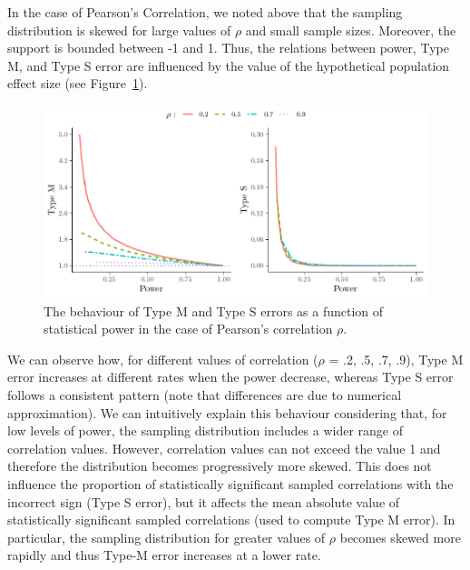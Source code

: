 \documentclass{article}\usepackage[]{graphicx}\usepackage[]{color}
\makeatletter
\def\maxwidth{ %
  \ifdim\Gin@nat@width>\linewidth
    \linewidth
  \else
    \Gin@nat@width
  \fi
}
\newenvironment{knitrout}{}{} %
\makeatother
\begin{document}
\begin{refsection}
In the case of Pearson's Correlation, we noted above that the sampling distribution is skewed for large values of $\rho$ and small sample sizes. Moreover, the support is bounded between -1 and 1. Thus, the relations between power, Type M, and Type S error are influenced by the value of the hypothetical population effect size (see Figure~\ref{fig:Plot_rho}).



\begin{knitrout}
\color{fgcolor}\begin{figure}[!h]

{\centering \includegraphics[width=\maxwidth]{figure/Plot_rho-1} 

}

\caption[The behaviour of Type M and Type S errors as a function of statistical power in the case of Pearson's correlation $\rho$]{The behaviour of Type M and Type S errors as a function of statistical power in the case of Pearson's correlation $\rho$.}\label{fig:Plot_rho}
\end{figure}


\end{knitrout}


We can observe how, for different values of correlation ($\rho$ = .2, .5, .7, .9), Type M error increases at different rates when the power decrease, whereas Type S error follows a consistent pattern (note that differences are due to numerical approximation). We can intuitively explain this behaviour considering that, for low levels of power, the sampling distribution includes a wider range of correlation values. However, correlation values can not exceed the value 1 and therefore the distribution becomes progressively more skewed. This does not influence the proportion of statistically significant sampled correlations with the incorrect sign (Type S error), but it affects the mean absolute value of statistically significant sampled correlations (used to compute Type M error). In particular, the sampling distribution for greater values of $\rho$ becomes skewed more rapidly and thus Type-M error increases at a lower rate.


\end{refsection}
\end{document}
